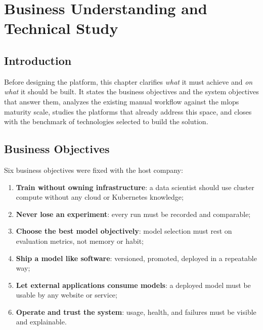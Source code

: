 \chapter{Business Understanding and Technical Study}
\label{chap:study}

\section{Introduction}
Before designing the platform, this chapter clarifies \emph{what} it must
achieve and \emph{on what} it should be built. It states the business
objectives and the system objectives that answer them, analyzes the existing
manual workflow against the \gls{mlops} maturity scale, studies the platforms
that already address this space, and closes with the benchmark of technologies
selected to build the solution.

\section{Business Objectives}
\label{sec:bo}
Six business objectives were fixed with the host company:
\begin{enumerate}[leftmargin=1.6em]
  \item \textbf{Train without owning infrastructure}: a data scientist should
        use cluster compute without any cloud or Kubernetes knowledge;
  \item \textbf{Never lose an experiment}: every run must be recorded and
        comparable;
  \item \textbf{Choose the best model objectively}: model selection must rest
        on evaluation metrics, not memory or habit;
  \item \textbf{Ship a model like software}: versioned, promoted, deployed in
        a repeatable way;
  \item \textbf{Let external applications consume models}: a deployed model
        must be usable by any website or service;
  \item \textbf{Operate and trust the system}: usage, health, and failures
        must be visible and explainable.
\end{enumerate}

